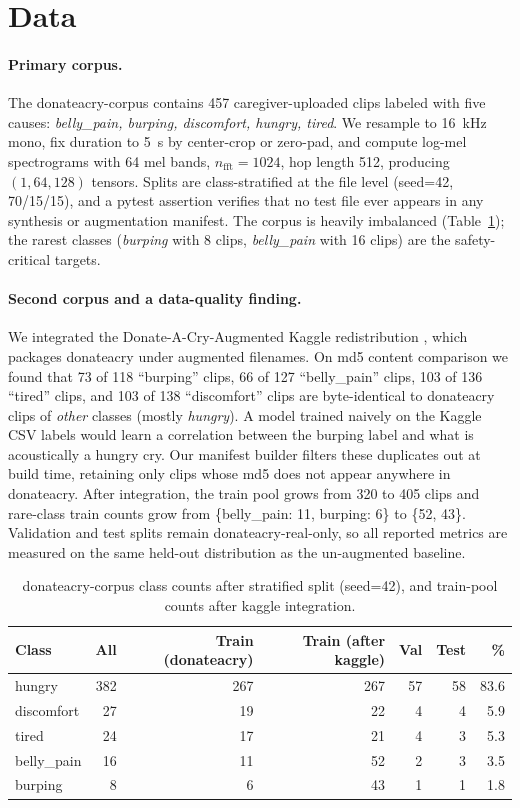 \documentclass[final]{article}
\begin{document}
\section{Data}\label{sec:data}
\paragraph{Primary corpus.} The donateacry-corpus \cite{donateacry} contains 457 caregiver-uploaded clips labeled with five causes: \textit{belly\_pain, burping, discomfort, hungry, tired}. We resample to 16~kHz mono, fix duration to 5~s by center-crop or zero-pad, and compute log-mel spectrograms with 64 mel bands, $n_{\text{fft}}=1024$, hop length 512, producing $(1, 64, 128)$ tensors. Splits are class-stratified at the file level (seed=42, 70/15/15), and a pytest assertion verifies that no test file ever appears in any synthesis or augmentation manifest. The corpus is heavily imbalanced (Table~\ref{tab:counts}); the rarest classes (\textit{burping} with 8 clips, \textit{belly\_pain} with 16 clips) are the safety-critical targets.

\paragraph{Second corpus and a data-quality finding.} We integrated the Donate-A-Cry-Augmented Kaggle redistribution \cite{trabelsi2024donateacryaugmented}, which packages donateacry under augmented filenames. On md5 content comparison we found that 73 of 118 ``burping'' clips, 66 of 127 ``belly\_pain'' clips, 103 of 136 ``tired'' clips, and 103 of 138 ``discomfort'' clips are byte-identical to donateacry clips of \emph{other} classes (mostly \textit{hungry}). A model trained naively on the Kaggle CSV labels would learn a correlation between the burping label and what is acoustically a hungry cry. Our manifest builder filters these duplicates out at build time, retaining only clips whose md5 does not appear anywhere in donateacry. After integration, the train pool grows from 320 to 405 clips and rare-class train counts grow from \{belly\_pain: 11, burping: 6\} to \{52, 43\}. Validation and test splits remain donateacry-real-only, so all reported metrics are measured on the same held-out distribution as the un-augmented baseline.

\begin{table}[H]
\centering
\caption{donateacry-corpus class counts after stratified split (seed=42), and train-pool counts after kaggle integration.}\label{tab:counts}
\begin{tabular}{lrrrrrr}
\toprule
Class & All & Train (donateacry) & Train (after kaggle) & Val & Test & \% \\
\midrule
hungry      & 382 & 267 & 267 & 57 & 58 & 83.6 \\
discomfort  & 27  & 19  & 22  & 4  & 4  & 5.9 \\
tired       & 24  & 17  & 21  & 4  & 3  & 5.3 \\
belly\_pain & 16  & 11  & 52  & 2  & 3  & 3.5 \\
burping     & 8   & 6   & 43  & 1  & 1  & 1.8 \\
\bottomrule
\end{tabular}
\end{table}
\end{document}
